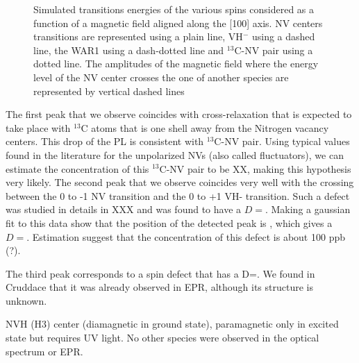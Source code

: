 \documentclass[9pt,twocolumn,twoside]{osajnl}
\begin{document}
\begin{figure}[htbp]
\centering
{}
\caption{Simulated transitions energies of the various spins considered as a function of a magnetic field aligned along the [100] axis. NV centers transitions are represented using a plain line, VH$^-$ using a dashed line, the WAR1 using a dash-dotted line and $^{13}$C-NV pair using a dotted line. The amplitudes of the magnetic field where the energy level of the NV center crosses the one of another species are represented by vertical dashed lines}
\label{energy-levels}
\end{figure}


The first peak that we observe coincides with cross-relaxation that is expected to take place with $^{13}$C atoms that is one shell away from the Nitrogen vacancy centers. 
This drop of the PL is consistent with $^{13}$C-NV pair.  Using typical values found in the literature for the unpolarized NVs (also called fluctuators), we can estimate the concentration of this $^{13}$C-NV pair to be XX, making this hypothesis very likely. 
The second peak that we observe coincides very well with the crossing between the 0 to -1 NV transition and the 0 to +1 VH- transition.
Such a defect was studied in details in XXX and was found to have a $D=$. 
Making a gaussian fit to this data show that the position of the detected peak is , which gives a $D=$.
Estimation suggest that the concentration of this defect is about 100 ppb (?).

The third peak corresponds to a spin defect that has a D=.
We found in Cruddace that it was already observed in EPR, although its structure is unknown.



NVH (H3) center (diamagnetic in ground state), paramagnetic only in excited state but requires UV light. 
No other species were observed in the optical spectrum or EPR. 
\end{document}
